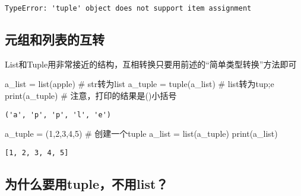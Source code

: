 \documentclass[
  letterpaper,
  DIV=11,
  numbers=noendperiod]{scrreprt}
\newenvironment{Shaded}{\begin{snugshade}}{\end{snugshade}}
\newcommand{\BuiltInTok}[1]{\textcolor[rgb]{0.00,0.23,0.31}{#1}}
\newcommand{\CommentTok}[1]{\textcolor[rgb]{0.37,0.37,0.37}{#1}}
\newcommand{\DecValTok}[1]{\textcolor[rgb]{0.68,0.00,0.00}{#1}}
\newcommand{\NormalTok}[1]{\textcolor[rgb]{0.00,0.23,0.31}{#1}}
\newcommand{\OperatorTok}[1]{\textcolor[rgb]{0.37,0.37,0.37}{#1}}
\newcommand{\StringTok}[1]{\textcolor[rgb]{0.13,0.47,0.30}{#1}}
\begin{document}
\begin{verbatim}
TypeError: 'tuple' object does not support item assignment
\end{verbatim}

\hypertarget{ux5143ux7ec4ux548cux5217ux8868ux7684ux4e92ux8f6c}{%
\subsection{元组和列表的互转}\label{ux5143ux7ec4ux548cux5217ux8868ux7684ux4e92ux8f6c}}

List和Tuple用非常接近的结构，互相转换只要用前述的``简单类型转换''方法即可

\begin{Shaded}
\begin{Highlighting}[]
\NormalTok{a\_list }\OperatorTok{=} \BuiltInTok{list}\NormalTok{(}\StringTok{\textquotesingle{}apple\textquotesingle{}}\NormalTok{) }\CommentTok{\# str转为list}
\NormalTok{a\_tuple }\OperatorTok{=} \BuiltInTok{tuple}\NormalTok{(a\_list) }\CommentTok{\# list转为tup;e}
\BuiltInTok{print}\NormalTok{(a\_tuple) }\CommentTok{\# 注意，打印的结果是()小括号}
\end{Highlighting}
\end{Shaded}

\begin{verbatim}
('a', 'p', 'p', 'l', 'e')
\end{verbatim}

\begin{Shaded}
\begin{Highlighting}[]
\NormalTok{a\_tuple }\OperatorTok{=}\NormalTok{ (}\DecValTok{1}\NormalTok{,}\DecValTok{2}\NormalTok{,}\DecValTok{3}\NormalTok{,}\DecValTok{4}\NormalTok{,}\DecValTok{5}\NormalTok{) }\CommentTok{\# 创建一个tuple}
\NormalTok{a\_list }\OperatorTok{=} \BuiltInTok{list}\NormalTok{(a\_tuple)}
\BuiltInTok{print}\NormalTok{(a\_list)}
\end{Highlighting}
\end{Shaded}

\begin{verbatim}
[1, 2, 3, 4, 5]
\end{verbatim}

\hypertarget{ux4e3aux4ec0ux4e48ux8981ux7528tupleux4e0dux7528list}{%
\subsection{为什么要用tuple，不用list？}\label{ux4e3aux4ec0ux4e48ux8981ux7528tupleux4e0dux7528list}}
\end{document}
